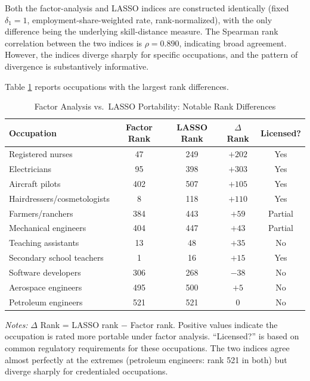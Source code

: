 \documentclass[12pt]{article}
\begin{document}
Both the factor-analysis and LASSO indices are constructed identically (fixed $\delta_1 = 1$, employment-share-weighted rate, rank-normalized), with the only difference being the underlying skill-distance measure. The Spearman rank correlation between the two indices is $\rho = 0.890$, indicating broad agreement. However, the indices diverge sharply for specific occupations, and the pattern of divergence is substantively informative.

Table \ref{tab:factor_lasso} reports occupations with the largest rank differences.

\begin{table}[H]
\centering
\caption{Factor Analysis vs.\ LASSO Portability: Notable Rank Differences}
\label{tab:factor_lasso}
\begin{tabular}{lcccc}
\toprule
\textbf{Occupation} & \textbf{Factor Rank} & \textbf{LASSO Rank} & \textbf{$\Delta$ Rank} & \textbf{Licensed?} \\
\midrule
Registered nurses             & 47  & 249 & $+202$ & Yes \\
Electricians                  & 95  & 398 & $+303$ & Yes \\
Aircraft pilots               & 402 & 507 & $+105$ & Yes \\
Hairdressers/cosmetologists   & 8   & 118 & $+110$ & Yes \\
Farmers/ranchers              & 384 & 443 & $+59$  & Partial \\
Mechanical engineers          & 404 & 447 & $+43$  & Partial \\
Teaching assistants            & 13  & 48  & $+35$  & No \\
Secondary school teachers     & 1   & 16  & $+15$  & Yes \\
Software developers           & 306 & 268 & $-38$  & No \\
Aerospace engineers           & 495 & 500 & $+5$   & No \\
Petroleum engineers           & 521 & 521 & $0$    & No \\
\bottomrule
\end{tabular}
\begin{minipage}{0.9\textwidth}
\vspace{0.5em}
\footnotesize \textit{Notes:} $\Delta$ Rank = LASSO rank $-$ Factor rank. Positive values indicate the occupation is rated more portable under factor analysis. ``Licensed?'' is based on common regulatory requirements for these occupations. The two indices agree almost perfectly at the extremes (petroleum engineers: rank 521 in both) but diverge sharply for credentialed occupations.
\end{minipage}
\end{table}
\end{document}
